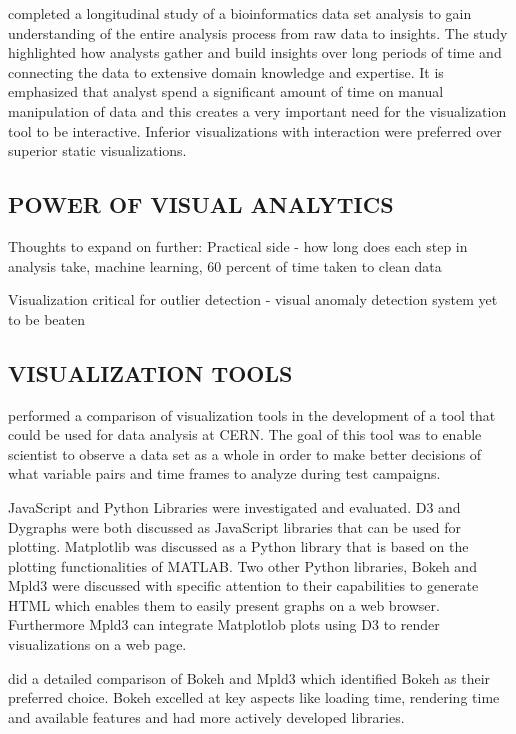 \cite{saraiya2006insight} completed a longitudinal study of a bioinformatics data set analysis to gain understanding of the entire analysis process from raw data to insights. The study highlighted how analysts gather and build insights over long periods of time and connecting the data to extensive domain knowledge and expertise. It is emphasized that analyst spend a significant amount of time on manual manipulation of data and this creates a very important need for the visualization tool to be interactive. Inferior visualizations with interaction were preferred over superior static visualizations.

\subsection{POWER OF VISUAL ANALYTICS}

Thoughts to expand on further:
Practical side - how long does each step in analysis take, machine learning, 60 percent of time taken to clean data

Visualization critical for outlier detection - visual anomaly detection system yet to be beaten

\subsection{VISUALIZATION TOOLS}

\cite{barnard2015usability} performed a comparison of visualization tools in the development of a tool that could be used for data analysis at CERN. The goal of this tool was to enable scientist to observe a data set as a whole in order to make better decisions of what variable pairs and time frames to analyze during test campaigns.

JavaScript and Python Libraries were investigated and evaluated. D3 and Dygraphs were both discussed as JavaScript libraries that can be used for plotting. Matplotlib was discussed as a Python library that is based on the plotting functionalities of MATLAB. Two other Python libraries, Bokeh and Mpld3 were discussed with specific attention to their capabilities to generate HTML which enables them to easily present graphs on a web browser. Furthermore Mpld3 can integrate Matplotlob plots using D3 to render visualizations on a web page.

\cite{barnard2015usability} did a detailed comparison of Bokeh and Mpld3 which identified Bokeh as their preferred choice. Bokeh excelled at key aspects like loading time, rendering time and available features and had more actively developed libraries.

